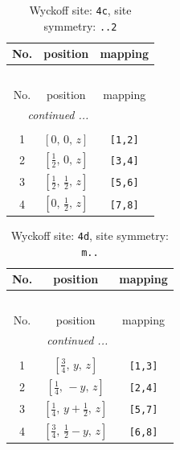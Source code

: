 \documentclass[fleqn,8pt]{jsarticle}
\begin{document}
\renewcommand{\arraystretch}{1.2}
\begin{longtable}{ccc}
\caption{Wyckoff site: {\tt 4c}, site symmetry: {\tt ..2}}
 \\
 \hline \hline
No. & position & mapping \\ \hline \endfirsthead

\multicolumn{2}{l}{\tablename\ \thetable{}} \\
 \hline \hline
No. & position & mapping \\ \hline \endhead

 \hline \hline
\multicolumn{2}{r}{\footnotesize\it continued ...} \\ \endfoot

 \hline \hline
\multicolumn{2}{r}{} \\ \endlastfoot

1 & $\left[ 0,\, 0,\, z \right]$ & {\tt [1,2]} \\ \hline
2 & $\left[ \frac{1}{2},\, 0,\, z \right]$ & {\tt [3,4]} \\ \hline
3 & $\left[ \frac{1}{2},\, \frac{1}{2},\, z \right]$ & {\tt [5,6]} \\ \hline
4 & $\left[ 0,\, \frac{1}{2},\, z \right]$ & {\tt [7,8]} \\
\end{longtable}
\renewcommand{\arraystretch}{1.2}
\begin{longtable}{ccc}
\caption{Wyckoff site: {\tt 4d}, site symmetry: {\tt m..}}
 \\
 \hline \hline
No. & position & mapping \\ \hline \endfirsthead

\multicolumn{2}{l}{\tablename\ \thetable{}} \\
 \hline \hline
No. & position & mapping \\ \hline \endhead

 \hline \hline
\multicolumn{2}{r}{\footnotesize\it continued ...} \\ \endfoot

 \hline \hline
\multicolumn{2}{r}{} \\ \endlastfoot

1 & $\left[ \frac{3}{4},\, y,\, z \right]$ & {\tt [1,3]} \\ \hline
2 & $\left[ \frac{1}{4},\, - y,\, z \right]$ & {\tt [2,4]} \\ \hline
3 & $\left[ \frac{1}{4},\, y + \frac{1}{2},\, z \right]$ & {\tt [5,7]} \\ \hline
4 & $\left[ \frac{3}{4},\, \frac{1}{2} - y,\, z \right]$ & {\tt [6,8]} \\
\end{longtable}
\end{document}
